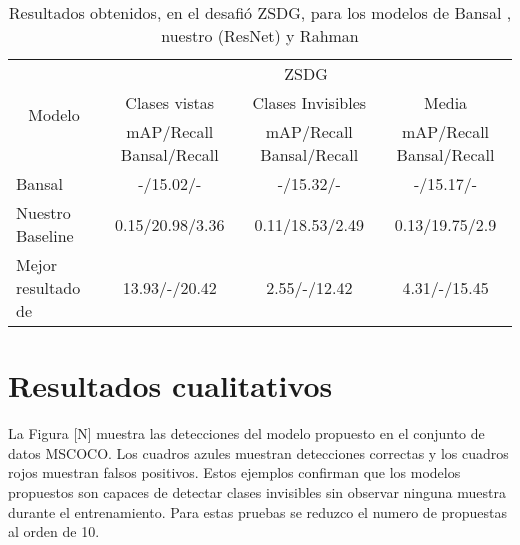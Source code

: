 \begin{table}[]
	\centering
	\resizebox{12.5cm}{1.2cm} {
	\begin{tabular}{|l|c|c|c|}
		\hline
		\multicolumn{1}{|c|}{\multirow{3}{*}{Modelo}} & \multicolumn{3}{c|}{ZSDG}                                                       \\ \cline{2-4} 
		\multicolumn{1}{|c|}{}                        & Clases vistas             & Clases Invisibles        & Media                    \\ \cline{2-4} 
		\multicolumn{1}{|c|}{}                        & mAP/Recall Bansal/Recall  & mAP/Recall Bansal/Recall & mAP/Recall Bansal/Recall \\ \hline
		Bansal                                        & -/15.02/-                 & -/15.32/-                & -/15.17/-                \\ \hline
		Nuestro Baseline                              & 0.15/20.98/3.36           & 0.11/18.53/2.49          & 0.13/19.75/2.9           \\ \hline
		Mejor  resultado de \cite{rahman2020zero}     & 13.93/-/20.42             & 2.55/-/12.42             & 4.31/-/15.45             \\ \hline
	\end{tabular}
	}
	\caption{Resultados obtenidos, en el desafió ZSDG, para los modelos de Bansal \cite{bansal2018zero}, nuestro (ResNet) y Rahman \cite{rahman2020zero}}
	\label{tab:resultados-zsdg}
\end{table}

\section{Resultados cualitativos} \label{sec:resultadoscualitativos}

La Figura [N] muestra las detecciones del modelo propuesto en el conjunto de datos MSCOCO. Los cuadros azules muestran detecciones correctas y los cuadros rojos muestran falsos positivos. Estos ejemplos confirman que los modelos propuestos son capaces de detectar clases invisibles sin observar ninguna muestra durante el entrenamiento. Para estas pruebas se reduzco el numero de propuestas al orden de 10.